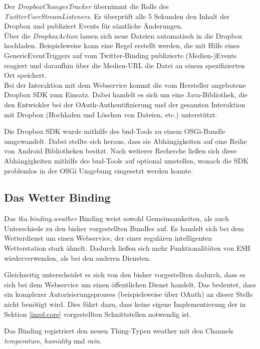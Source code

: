 Der \textit{DropboxChangesTracker} übernimmt die Rolle des \textit{TwitterUserStreamListeners}. Er überprüft alle 5 Sekunden den Inhalt der Dropbox und publiziert Events für sämtliche Änderungen.\\

Über die \textit{DropboxAction} lassen sich neue Dateien automatisch in die Dropbox hochladen. Beispielsweise kann eine Regel erstellt werden, die mit Hilfe eines GenericEventTriggers auf vom Twitter-Binding publizierte (Medien-)Events reagiert und daraufhin über die Medien-URL die Datei an einem spezifizierten Ort speichert.\\

Bei der Interaktion mit dem Webservice kommt die vom Hersteller angebotene Dropbox SDK zum Einsatz. Dabei handelt es sich um eine Java-Bibliothek, die den Entwickler bei der OAuth-Authentifizierung und der gesamten Interaktion mit Dropbox (Hochladen und Löschen von Dateien, etc.) unterstützt. 

Die Dropbox SDK wurde mithilfe des bnd-Tools\cite{bnd} zu einem OSGi-Bundle umgewandelt. Dabei stellte sich heraus, dass sie Abhängigkeiten auf eine Reihe von Android Bibliotheken besitzt. Nach weiterer Recherche ließen sich diese Abhängigkeiten mithilfe des bnd-Tools auf optional umstellen, wonach die SDK problemlos in der OSGi Umgebung eingesetzt werden konnte. 


\subsection{Das Wetter Binding}
Das \textit{tka.binding.weather} Binding weist sowohl Gemeinsamkeiten, als auch Unterschiede zu den bisher vorgestellten Bundles auf. Es handelt sich bei dem Wetterdienst um einen Webservice, der einer regulären intelligenten Wetterstation stark ähnelt. Dadurch ließen sich mehr Funktionalitäten von ESH wiederverwenden, als bei den anderen Diensten.

Gleichzeitig unterscheidet es sich von den bisher vorgestellten dadurch, dass es sich bei dem Webservice um einen öffentlichen Dienst handelt. Das bedeutet, dass ein komplexer Autorisierungsprozess (beispielsweise über OAuth) an dieser Stelle nicht benötigt wird. Dies führt dazu, dass keine eigene Implementierung der in Sektion \ref{impl:core} vorgestellten Schnittstellen notwendig ist. 

Das Binding registriert den neuen Thing-Typen \glqq weather\grqq{} mit den Channels \textit{temperature}, \textit{humidity} und \textit{rain}. 


